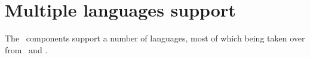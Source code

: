



\chapter{Multiple languages support}

The \mf\ components support a number of languages, most of which being taken over from \mxml\ and \lily.

